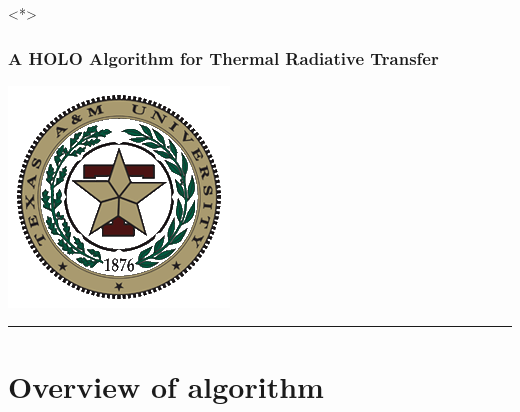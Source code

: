 \documentclass[xcolor=dvipsnames,hyperref={pdfpagelabels=false},unknownkeysallowed,
handout]{beamer}
\newcommand{\shorttitle}{\color{black} A HOLO Algorithm for Thermal Radiative Transfer
    \makebox[\linewidth]{\rule{\textwidth}{5pt}}
}
\begin{document}
\begin{frame}<*>
    \frametitle{\shorttitle}
        \vspace{0pt}
        \begin{minipage}[c][0.6\textheight]{0.2\textwidth}
            \hspace{-2em}\includegraphics[width=\textwidth]{tamu_seal.png}\hspace{1em}
            \rule[-0.3\textheight]{1pt}{0.8\textheight}
        \end{minipage}
    \vspace{0pt}
        \begin{minipage}[c][0.6\textheight]{0.74\textwidth}
\tableofcontents[
hideothersubsections,
sectionstyle=show,
subsectionstyle=hide
]
         \end{minipage}
\end{frame}
\section{Overview of algorithm}
\end{document}
